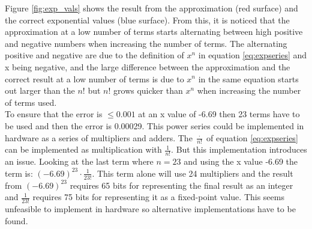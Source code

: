 Figure \vref{fig:exp_vals} shows the result from the approximation (red surface) and the correct exponential values (blue surface). From this, it is noticed that the approximation at a low number of terms starts alternating between high positive and negative numbers when increasing the number of terms. The alternating positive and negative are due to the definition of $x^n$ in equation \ref{eq:expseries} and x being negative, and the large difference between the approximation and the correct result at a low number of terms is due to $x^n$ in the same equation starts out larger than the $n!$ but $n!$ grows quicker than $x^n$ when increasing the number of terms used.\\

To ensure that the error is $\leq 0.001$ at an x value of -6.69 then 23 terms have to be used and then the error is 0.00029. This power series could be implemented in hardware as a series of multipliers and adders. The $\frac{\cdot}{n!}$ of equation \ref{eq:expseries} can be implemented as multiplication with $\frac{1}{n!}$. But this implementation introduces an issue. Looking at the last term where $n=23$ and using the x value -6.69 the term is: $(-6.69)^{23} \cdot \frac{1}{23!}$. This term alone will use 24 multipliers and the result from $(-6.69)^{23}$ requires 65 bits for representing the final result as an integer and $\frac{1}{23!}$ requires 75 bits for representing it as a fixed-point value. This seems unfeasible to implement in hardware so alternative implementations have to be found.\\

